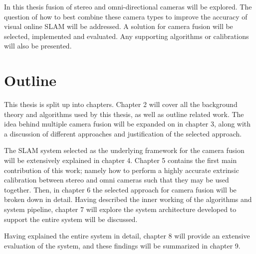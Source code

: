 In this thesis fusion of stereo and omni-directional cameras will be explored.  The question of how to best combine these camera types to improve the accuracy of visual online SLAM will be addressed.  A solution for camera fusion will be selected, implemented and evaluated.  Any supporting algorithms or calibrations will also be presented.

\section{Outline}

This thesis is split up into chapters.  Chapter 2 will cover all the background theory and  algorithms used by this thesis, as well as outline related work.  The idea behind multiple camera fusion will be expanded on in chapter 3, along with a discussion of different approaches and justification of the selected approach. 

The SLAM system selected as the underlying framework for the camera fusion will be extensively explained in chapter 4.  Chapter 5 contains the first main contribution of this work; namely how to perform a highly accurate extrinsic calibration between stereo and omni cameras such that they may be used together.  Then, in chapter 6 the selected approach for camera fusion will be broken down in detail.  Having described the inner working of the algorithms and system pipeline, chapter 7 will explore the system architecture developed to support the entire system will be discussed.

Having explained the entire system in detail, chapter 8 will provide an extensive evaluation of the system, and these findings will be summarized in chapter 9.